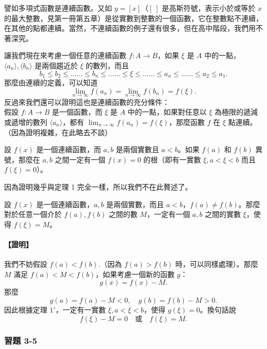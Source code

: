 譬如多項式函數是連續函數。又如 $y = [x]$（$[\ ]$ 是高斯符號，表示小於或等於 $x$ 的最大整數，見第一冊第五章）是從實數到整數的一個函數，它在整數點不連續，在其他的點都連續。當然，不連續函數的例子還有很多，但在高中階段，我們用不著深究。

讓我們現在來考慮一個任意的連續函數 $f: A \longrightarrow B$，如果 $\xi$ 是 $A$ 中的一點，$\langle a_n \rangle, \langle b_n \rangle$ 是兩個趨近於 $\xi$ 的數列，而且
\[
b_1 \le b_2 \le \dots\dots \le b_n \le \dots\dots \le \xi \le \dots\dots \le a_n \le \dots\dots \le a_2 \le a_1.
\]
那麼由連續的定義，可以知道
\[
\lim_{n\to\infty} f(a_n) = \lim_{n\to\infty} f(b_n) = f(\xi).
\]
反過來我們還可以證明這也是連續函數的充分條件：\\
假設 $f: A \longrightarrow B$ 是一個函數，而 $\xi$ 是 $A$ 中的一點，如果對任意以 $\xi$ 為極限的遞減或遞增的數列 $\langle a_n \rangle$，都有 $\lim_{n\to\infty} f(a_n) = f(\xi)$，那麼函數 $f$ 在 $\xi$ 點連續。（因為證明複雜，在此略去不談）

\begin{theorem}[定理 $1'$（連續函數的中間值定理）]
設 $f(x)$ 是一個連續函數，而 $a, b$ 是兩個實數且 $a < b$。如果 $f(a)$ 和 $f(b)$ 異號，那麼在 $a, b$ 之間一定有一個 $f(x)=0$ 的根（即有一實數 $\xi, a < \xi < b$ 而且 $f(\xi)=0$）。
\end{theorem}
因為證明幾乎與定理 1 完全一樣，所以我們不在此贅述了。

\begin{prop}[推論]
設 $f(x)$ 是一個連續函數，$a, b$ 是兩個實數，而且 $a < b$，$f(a) \neq f(b)$。那麼對於任意一個介於 $f(a), f(b)$ 之間的數 $M$，一定有一個 $a, b$ 之間的實數 $\xi$，使得 $f(\xi)=M$。
\end{prop}
\paragraph{【證明】}
我們不妨假設 $f(a) < f(b)$.（因為 $f(a) > f(b)$ 時，可以同樣處理）。那麼 $M$ 滿足 $f(a) < M < f(b)$，如果考慮一個新的函數 $g$：
\[
g(x) = f(x) - M.
\]
那麼
\[
g(a) = f(a) - M < 0,\quad g(b) = f(b) - M > 0.
\]
因此根據定理 $1'$，一定有一實數 $\xi, a < \xi < b$，使得 $g(\xi)=0$。換句話說
\[
f(\xi)-M = 0 \quad \text{或} \quad f(\xi)=M.
\]

\subsubsection*{習題 3-5}

